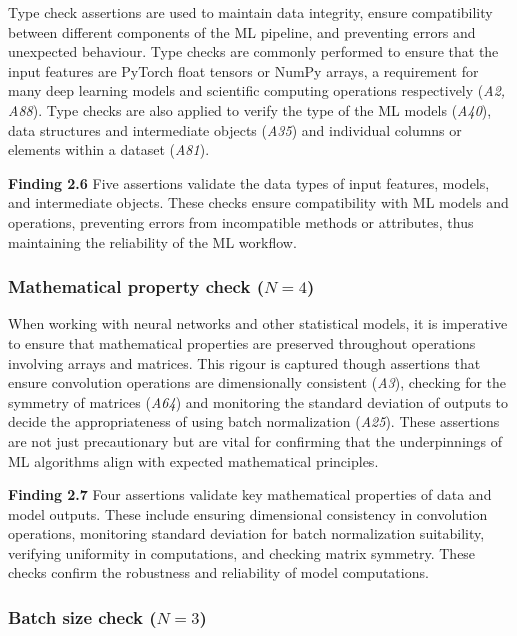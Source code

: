 \documentclass[smallextended]{svjour3}       %
\newcommand{\highlight}[1]{\begin{framed}%
  \noindent#1
\end{framed}}
\begin{document}
Type check assertions are used to maintain data integrity, ensure compatibility between different components of the ML pipeline, and preventing errors and unexpected behaviour. Type checks are commonly performed to ensure that the input features are PyTorch float tensors or NumPy arrays, a requirement for many deep learning models and scientific computing operations respectively (\emph{A2, A88}). Type checks are also applied to verify the type of the ML models (\emph{A40}), data structures and intermediate objects (\emph{A35}) and individual columns or elements within a dataset (\emph{A81}).

\highlight{\textbf{Finding 2.6} Five assertions validate the data types of input features, models, and intermediate objects. These checks ensure compatibility with ML models and operations, preventing errors from incompatible methods or attributes, thus maintaining the reliability of the ML workflow.}

\subsubsection{Mathematical property check ($N = 4$)}

When working with neural networks and other statistical models, it is imperative to ensure that mathematical properties are preserved throughout operations involving arrays and matrices. This rigour is captured though assertions that ensure convolution operations are dimensionally consistent (\emph{A3}), checking for the symmetry of matrices (\emph{A64}) and monitoring the standard deviation of outputs to decide the appropriateness of using batch normalization (\emph{A25}). These assertions are not just precautionary but are vital for confirming that the underpinnings of ML algorithms align with expected mathematical principles.

\highlight{\textbf{Finding 2.7} Four assertions validate key mathematical properties of data and model outputs. These include ensuring dimensional consistency in convolution operations, monitoring standard deviation for batch normalization suitability, verifying uniformity in computations, and checking matrix symmetry. These checks confirm the robustness and reliability of model computations.}

\subsubsection{Batch size check ($N = 3$)}
\end{document}
